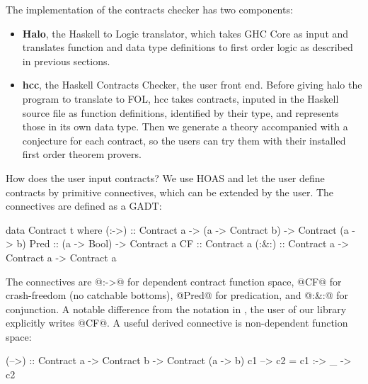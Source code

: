 The implementation of the contracts checker has two components:

\begin{itemize}
    \item \textbf{Halo}, the Haskell to Logic translator, which takes
       GHC Core as input and translates function and data type
       definitions to first order logic as described in previous sections.

     \item \textbf{hcc}, the Haskell Contracts Checker, the user front
        end. Before giving halo the program to translate to FOL, hcc
        takes contracts, inputed in the Haskell source file as function
        definitions, identified by their type, and represents those in
        its own data type. Then we generate a theory accompanied with a
        conjecture for each contract, so the users can try them with
        their installed first order theorem provers.
\end{itemize}

How does the user input contracts? We use HOAS and let the user define
contracts by primitive connectives, which can be extended by the user.
The connectives are defined as a GADT:

\begin{code}
data Contract t where
  (:->) :: Contract a
        -> (a -> Contract b)
        -> Contract (a -> b)
  Pred  :: (a -> Bool) -> Contract a
  CF    :: Contract a
  (:&:) :: Contract a -> Contract a -> Contract a
\end{code}

The connectives are @:->@ for dependent contract function space, @CF@
for crash-freedom (no catchable bottoms), @Pred@ for predication, and
@:&:@ for conjunction. A notable difference from the notation in
\cite{xu+:contracts}, the user of our library explicitly writes @CF@.
A useful derived connective is non-dependent function space:

\begin{code}
(-->) :: Contract a -> Contract b -> Contract (a -> b)
c1 --> c2 = c1 :-> \_ -> c2
\end{code}

%
%

